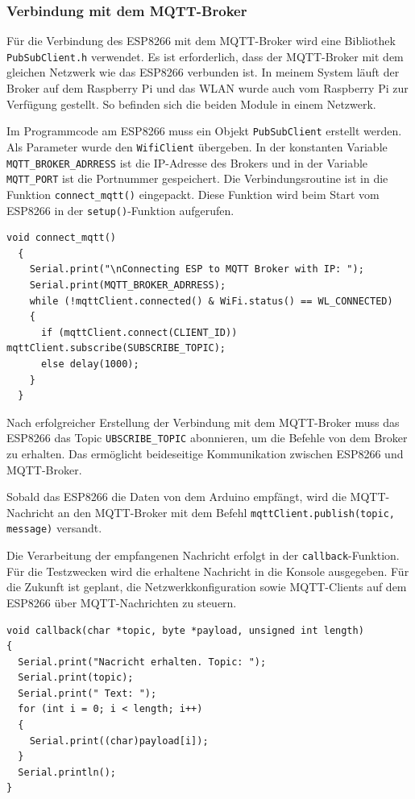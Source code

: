 \documentclass[12pt, letterpaper]{article}
\begin{document}
\subsubsection{Verbindung mit dem MQTT-Broker}
\par Für die Verbindung des ESP8266 mit dem MQTT-Broker wird eine Bibliothek \texttt{PubSubClient.h} verwendet. Es ist erforderlich, dass der MQTT-Broker mit dem gleichen Netzwerk wie das ESP8266 verbunden ist. In meinem System läuft der Broker auf dem Raspberry Pi und das WLAN wurde auch vom Raspberry Pi zur Verfügung gestellt. So befinden sich die beiden Module in einem Netzwerk. 
\par Im Programmcode am ESP8266 muss ein Objekt \texttt{PubSubClient} erstellt werden. Als Parameter wurde den \texttt{WifiClient} übergeben. In der konstanten Variable \texttt{MQTT\_BROKER\_ADRRESS} ist die IP-Adresse des Brokers und in der Variable \texttt{MQTT\_PORT} ist die Portnummer gespeichert. Die Verbindungsroutine ist in die Funktion \texttt{connect\_mqtt()} eingepackt. Diese Funktion wird beim Start vom ESP8266 in der \texttt{setup()}-Funktion aufgerufen.
\begin{lstlisting}[frame=single, style=cpp, caption={ESP8266: connect\_mqtt()}]
  void connect_mqtt()
  {
    Serial.print("\nConnecting ESP to MQTT Broker with IP: ");
    Serial.print(MQTT_BROKER_ADRRESS);
    while (!mqttClient.connected() & WiFi.status() == WL_CONNECTED)
    {
      if (mqttClient.connect(CLIENT_ID)) mqttClient.subscribe(SUBSCRIBE_TOPIC);
      else delay(1000);
    }
  }
\end{lstlisting}
\par Nach erfolgreicher Erstellung der Verbindung mit dem MQTT-Broker muss das ESP8266 das Topic \texttt{UBSCRIBE\_TOPIC} abonnieren, um die Befehle von dem Broker zu erhalten. Das ermöglicht beideseitige Kommunikation zwischen ESP8266 und MQTT-Broker.
\par Sobald das ESP8266 die Daten von dem Arduino empfängt, wird die MQTT-Nachricht an den MQTT-Broker mit dem Befehl \texttt{mqttClient.publish(topic, message)} versandt.
\par Die Verarbeitung der empfangenen Nachricht erfolgt in der \texttt{callback}-Funktion. Für die Testzwecken wird die erhaltene Nachricht in die Konsole ausgegeben. Für die Zukunft ist geplant, die Netzwerkkonfiguration sowie MQTT-Clients auf dem ESP8266 über MQTT-Nachrichten zu steuern.

\begin{lstlisting}[frame=none, style=cpp, caption={ESP8266: callback()},captionpos=b]
  void callback(char *topic, byte *payload, unsigned int length)
{
  Serial.print("Nacricht erhalten. Topic: ");
  Serial.print(topic);
  Serial.print(" Text: ");
  for (int i = 0; i < length; i++)
  {
    Serial.print((char)payload[i]);
  }
  Serial.println();
}
\end{lstlisting}
\newpage
\end{document}
